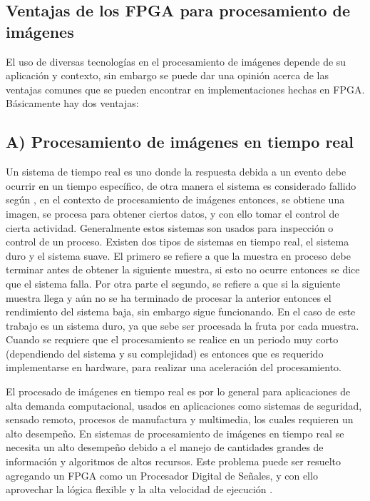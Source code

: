 \documentclass[twoside,spanish,ESP,MSc]{plantillaLabUPV}
\theoremstyle{definition}
\begin{document}
\subsection{Ventajas de los FPGA para procesamiento de imágenes}


%
El uso de diversas tecnologías en el procesamiento de imágenes depende de su aplicación y contexto, sin embargo se puede dar una opinión acerca de las ventajas comunes que se pueden encontrar en implementaciones hechas en FPGA. Básicamente hay dos ventajas:

\subsection*{A) Procesamiento de imágenes en tiempo real}
Un sistema de tiempo real es uno donde la respuesta debida a un evento debe ocurrir en un tiempo específico, de otra manera el sistema es considerado fallido según \cite{baleyrt}, en el contexto de procesamiento de imágenes entonces, se obtiene una imagen, se procesa para obtener ciertos datos, y con ello tomar el control de cierta actividad. Generalmente estos sistemas son usados para inspección o control de un proceso. Existen dos tipos de sistemas en tiempo real, el sistema duro y el sistema suave. El primero se refiere a que la muestra en proceso debe terminar antes de obtener la siguiente muestra, si esto no ocurre entonces se dice que el sistema falla. Por otra parte el segundo, se refiere a que si la siguiente muestra llega y aún no se ha terminado de procesar la anterior entonces el rendimiento del sistema baja, sin embargo sigue funcionando. En el caso de este trabajo es un sistema duro, ya que sebe ser procesada la fruta por cada muestra. Cuando se requiere que el procesamiento se realice en un periodo muy corto (dependiendo del sistema y su complejidad) es entonces que es requerido implementarse en hardware, para realizar una aceleración del procesamiento.

El procesado de imágenes en tiempo real es por lo general para aplicaciones de alta demanda computacional, usados en aplicaciones como sistemas de seguridad, sensado remoto, procesos de manufactura y multimedia, los cuales requieren un alto desempeño. En sistemas de procesamiento de imágenes en tiempo real se necesita un alto desempeño debido a el manejo de cantidades grandes de información y algoritmos de altos recursos. Este problema puede ser resuelto agregando un FPGA como un Procesador Digital de Señales, y con ello aprovechar la lógica flexible y la alta velocidad de ejecución \cite{ieeerealtime}.
\end{document}
